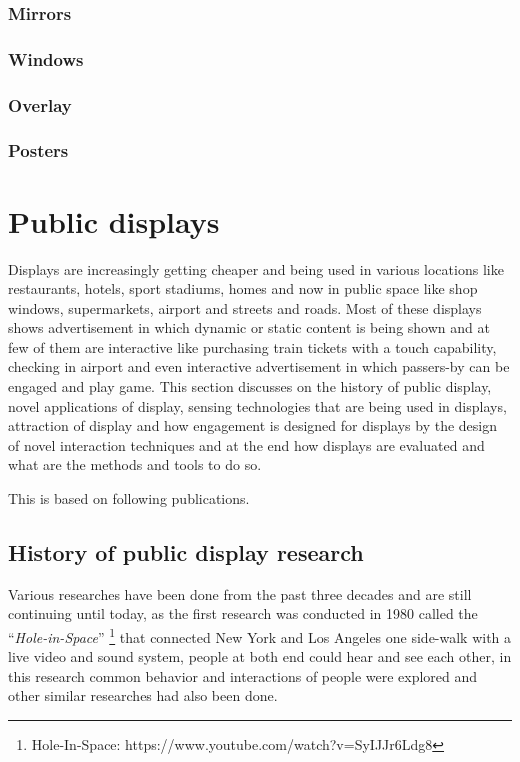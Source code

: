 \subsubsection{Mirrors}
\subsubsection{Windows}
\subsubsection{Overlay}
\subsubsection{Posters}

\section{Public displays}

Displays are increasingly getting cheaper and being used in various locations like restaurants, hotels, sport stadiums, homes and now in public space like shop windows, supermarkets, airport and streets and roads. Most of these displays shows advertisement in which dynamic or static content is being shown and at few of them are interactive like purchasing train tickets with a touch capability, checking in airport and even interactive advertisement in which passers-by can be engaged and play game. 
This section discusses on the history of public display, novel applications of display, sensing technologies that are being used in displays, attraction of display and how engagement is designed for displays by the design of novel interaction techniques and at the end how displays are evaluated and what are the methods and tools to do so.


\begin{snugshade}
This is based on following publications.
\end{snugshade}


\subsection{History of public display research}

Various researches have been done from the past three decades and are still continuing until today, as the first research was conducted in 1980 called the ``\emph{Hole-in-Space}'' \footnote{Hole-In-Space: https://www.youtube.com/watch?v=SyIJJr6Ldg8} that connected New York and Los Angeles one side-walk with a live video and sound system, people at both end could hear and see each other, in this research common behavior and interactions of people were explored and other similar researches had also been done.\\

